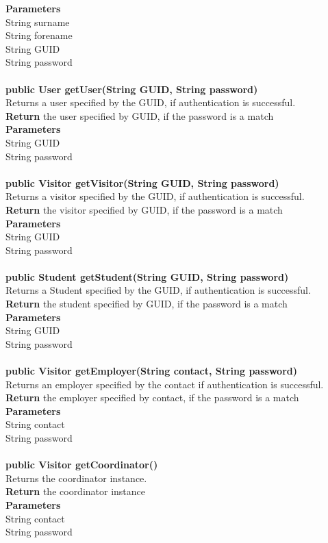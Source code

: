 \documentclass{l3deliverable}
\begin{document}
\textbf{Parameters}\\
String surname\\
String forename\\
String GUID\\
String password\\
\\
\textbf{public User getUser(String GUID, String password)}\\
Returns a user specified by the GUID, if authentication is successful.\\
\textbf{Return} the user specified by GUID, if the password is a match\\
\textbf{Parameters}\\
String GUID\\
String password\\
\\
\textbf{public Visitor getVisitor(String GUID, String password)}\\
Returns a visitor specified by the GUID, if authentication is successful.\\
\textbf{Return} the visitor specified by GUID, if the password is a match\\
\textbf{Parameters}\\
String GUID\\
String password\\
\\
\textbf{public Student getStudent(String GUID, String password)}\\
Returns a Student specified by the GUID, if authentication is successful.\\
\textbf{Return} the student specified by GUID, if the password is a match\\
\textbf{Parameters}\\
String GUID\\
String password\\
\\
\textbf{public Visitor getEmployer(String contact, String password)}\\
Returns an employer specified by the contact if authentication is successful.\\
\textbf{Return} the employer specified by contact, if the password is a match\\
\textbf{Parameters}\\
String contact\\
String password\\
\\
\textbf{public Visitor getCoordinator()}\\
Returns the coordinator instance.\\
\textbf{Return} the coordinator instance\\
\textbf{Parameters}\\
String contact\\
String password\\
\\
\end{document}
